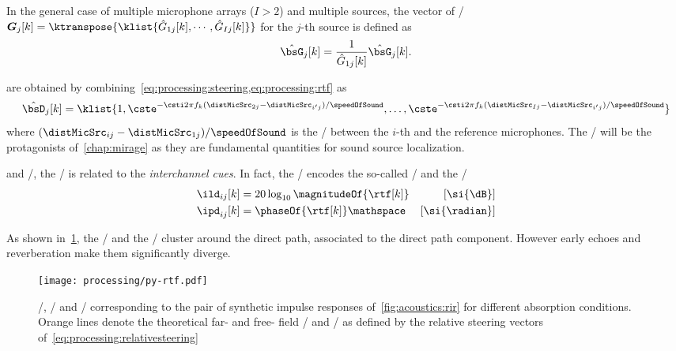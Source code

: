 In the general case of multiple microphone arrays ($I>2$) and multiple sources, the vector of \ReTFs/
$\boldsymbol{G}_j[k] = \ktranspose{\klist{\hat{G}_ {1j}[k], \cdots, \hat{G}_{Ij}[k]}}$
for the $j$-th source is defined as
\begin{equation}
    \hat{\bsG}_j[k] = \frac{1}{\hat{G}_{1j}[k]} \hat{\bsG}_j[k]
    .
\end{equation}


 are obtained by combining~\cref{eq:processing:steering,eq:processing:rtf} as
\begin{equation}\label{eq:processing:relativesteering}
    \hat{\bsD}_{j}[k] = \klist{
                         1,
                         \cste^{-\csti 2 \pi f_k (\distMicSrc_{2j}-\distMicSrc_{i'j}) / \speedOfSound},
                         \ldots,
                         \cste^{-\csti 2 \pi f_k (\distMicSrc_{Ij}-\distMicSrc_{i'j}) / \speedOfSound}
                    }
\end{equation}
where $(\distMicSrc_{ij}-\distMicSrc_{1j}) / \speedOfSound$ is the \TDOA/ between the $i$-th and the reference microphones.
The \TDOAs/ will be the protagonists of~\cref{chap:mirage} as they are fundamental quantities for sound source localization.

 and \CASA/, the \ReTF/ is related to the \textit{interchannel cues}.
In fact, the \ReTFs/ encodes the so-called \ILD/ and the \IPD/
\begin{equation}
    \begin{aligned}
        \ild_{ij}[k] &= 20 \log_{10} \magnitudeOf{\rtf[k]} & [\si{\dB}]\\
        \ipd_{ij}[k] &= \phaseOf{\rtf[k]} \mathspace       & [\si{\radian}]
    \end{aligned}
\end{equation}

As shown in~\cref{fig:processing:ildipd}, the \ILD/ and the \IPD/ cluster around the direct path, associated to the direct path component.
However early echoes and reverberation make them significantly diverge.

\begin{figure}[b]
    \begin{fullwidth}
        \texttt{[image: processing/py-rtf.pdf]}
        \caption{
            \RIR/, \ILD/ and \IPD/ corresponding to the pair of synthetic impulse responses of~\cref{fig:acoustics:rir} for different absorption conditions.
            Orange lines denote the theoretical far- and free- field \ILD/ and \IPD/ as defined by the relative steering vectors of~\cref{eq:processing:relativesteering}
        }\label{fig:processing:ildipd}
    \end{fullwidth}
\end{figure}


